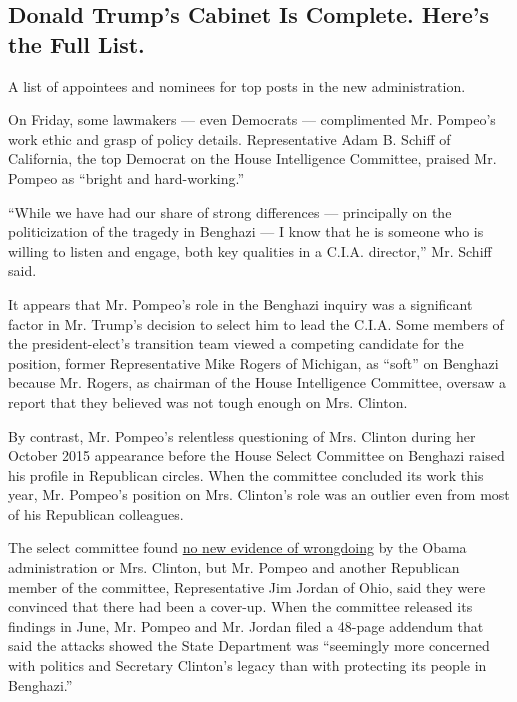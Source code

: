 \hypertarget{donald-trumps-cabinet-is-complete-heres-the-full-list}{%
\subsection{Donald Trump's Cabinet Is Complete. Here's the Full
List.}\label{donald-trumps-cabinet-is-complete-heres-the-full-list}}

A list of appointees and nominees for top posts in the new
administration.

On Friday, some lawmakers --- even Democrats --- complimented Mr.
Pompeo's work ethic and grasp of policy details. Representative Adam B.
Schiff of California, the top Democrat on the House Intelligence
Committee, praised Mr. Pompeo as ``bright and hard-working.''

``While we have had our share of strong differences --- principally on
the politicization of the tragedy in Benghazi --- I know that he is
someone who is willing to listen and engage, both key qualities in a
C.I.A. director,'' Mr. Schiff said.

It appears that Mr. Pompeo's role in the Benghazi inquiry was a
significant factor in Mr. Trump's decision to select him to lead the
C.I.A. Some members of the president-elect's transition team viewed a
competing candidate for the position, former Representative Mike Rogers
of Michigan, as ``soft'' on Benghazi because Mr. Rogers, as chairman of
the House Intelligence Committee, oversaw a report that they believed
was not tough enough on Mrs. Clinton.

By contrast, Mr. Pompeo's relentless questioning of Mrs. Clinton during
her October 2015 appearance before the House Select Committee on
Benghazi raised his profile in Republican circles. When the committee
concluded its work this year, Mr. Pompeo's position on Mrs. Clinton's
role was an outlier even from most of his Republican colleagues.

The select committee found
\href{http://www.nytimes.com/2016/06/29/us/politics/hillary-clinton-benghazi.html}{no
new evidence of wrongdoing} by the Obama administration or Mrs. Clinton,
but Mr. Pompeo and another Republican member of the committee,
Representative Jim Jordan of Ohio, said they were convinced that there
had been a cover-up. When the committee released its findings in June,
Mr. Pompeo and Mr. Jordan filed a 48-page addendum that said the attacks
showed the State Department was ``seemingly more concerned with politics
and Secretary Clinton's legacy than with protecting its people in
Benghazi.''

